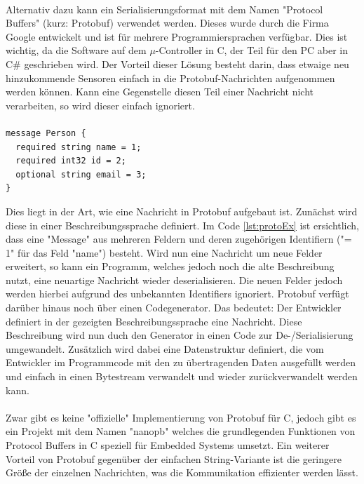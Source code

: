 \paragraph{}
Alternativ dazu kann ein Serialisierungsformat mit dem Namen "Protocol Buffers" (kurz: Protobuf)  verwendet werden. Dieses wurde durch die Firma Google entwickelt und ist für mehrere Programmiersprachen verfügbar. Dies ist wichtig, da die Software auf dem $\mu$-Controller in C, der Teil für den PC aber in C\# geschrieben wird. Der Vorteil dieser Lösung besteht darin, dass etwaige neu hinzukommende Sensoren einfach in die Protobuf-Nachrichten aufgenommen werden können. Kann eine Gegenstelle diesen Teil einer Nachricht nicht verarbeiten, so wird dieser einfach ignoriert.
\paragraph{}
\begin{lstlisting}[caption=Beispieldefinition einer Protocol Buffers Nachricht, label=lst:protoEx]
message Person {
  required string name = 1;
  required int32 id = 2;
  optional string email = 3;
}
\end{lstlisting}
Dies liegt in der Art, wie eine Nachricht in Protobuf aufgebaut ist. Zunächst wird diese in einer Beschreibungssprache definiert.
Im Code \ref{lst:protoEx} ist ersichtlich, dass eine "Message" aus mehreren Feldern und deren zugehörigen Identifiern ("= 1" für das Feld "name") besteht. Wird nun eine Nachricht um neue Felder erweitert, so kann ein Programm, welches jedoch noch die alte Beschreibung nutzt, eine neuartige Nachricht wieder deserialisieren. Die neuen Felder jedoch werden hierbei aufgrund des unbekannten Identifiers ignoriert. Protobuf verfügt darüber hinaus noch über einen Codegenerator. Das bedeutet: Der Entwickler definiert in der gezeigten Beschreibungssprache eine Nachricht. Diese Beschreibung wird nun duch den Generator in einen Code zur De-/Serialisierung umgewandelt. Zusätzlich wird dabei eine Datenstruktur definiert, die vom Entwickler im Programmcode mit den zu übertragenden Daten ausgefüllt werden und einfach in einen Bytestream verwandelt und wieder zurückverwandelt werden kann.
\paragraph{}
Zwar gibt es keine "offizielle" Implementierung von Protobuf für C, jedoch gibt es ein Projekt mit dem Namen "nanopb" welches die grundlegenden Funktionen von Protocol Buffers in C speziell für Embedded Systems umsetzt. Ein weiterer Vorteil von Protobuf gegenüber der einfachen String-Variante ist die geringere Größe der einzelnen Nachrichten, was die Kommunikation effizienter werden lässt.
